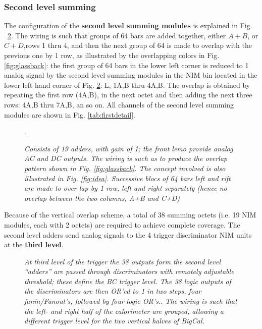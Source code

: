 \documentclass{chowto}
\begin{document}
\subsubsection{Second level summing}

The configuration of the {\bf second level summing modules} is explained in 
Fig. ~\ref{fig:secondlevel}. The
wiring is such that groups of 64 bars are added together, either $A+B$, or 
$C+D$,rows 1 
thru 4, and then the next group of 64 is made to overlap with the previous 
one by 1 row, as illustrated by the overlapping colors in Fig. 
\ref{fig:glassback}: the first group of 
64 bars in the lower left corner is reduced to 1 analog signal by the second 
level summing modules in the NIM bin located in the lower left hand 
corner of Fig. \ref{fig:secondlevel}: L, 1A,B thru 4A,B.
The overlap is obtained by repeating the first row (4A,B), in the next octet 
and then adding 
the next three rows: 4A,B thru 7A,B, an so on. All channels of the second 
level summing modules are shown in Fig. \ref{tab:firstdetail}.


\begin{figure}[h]
\begin{center}
\caption[]{\it{Consists of 19 adders, with gain of 1; the front lemo 
provide analog AC and DC outputs. The wiring is such as to produce the 
overlap pattern shown in Fig. \ref{fig:glassback}. The concept involved is 
also illustrated in Fig. \ref{fig:idea}. Successive blocs of 64 bars left 
and rift are made to over lap by 1 row, left and right separately (hence 
no overlap between the two columns, A+B and C+D)}}.
\label{fig:secondlevel}
\end{center}
\end{figure}
Because of the vertical overlap scheme, a total of 38 summing octets (i.e. 19
NIM modules, each with 2 octets)
are required to achieve complete coverage. The second level adders send 
analog signals to the 4 trigger discriminator NIM units at the 
{\bf third level}. 

\begin{figure}[h]
\begin{center}
\caption[]{\it{At third level of the trigger the 38 outputs form the 
second level ``adders'' are passed through discriminators with remotely 
adjustable threshold; these define the BC trigger level. The 38 logic 
outputs of the discriminators are then OR'ed to 1 in two steps, four fanin/Fanout's, followed by four logic OR's.. The wiring 
is such that the left- and right half of the calorimeter are grouped, 
allowing a different trigger level for the two vertical halves of BigCal.  }}
\label{fig:secondlevel}
\end{center}
\end{figure}
\end{document}
